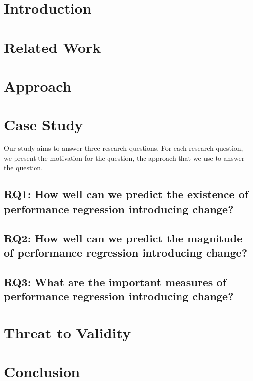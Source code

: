 \documentclass[conference]{IEEEtran}
\begin{document}
%
\IEEEpeerreviewmaketitle

\section{Introduction}
\label{sec:intro}


\section{Related Work}
\label{sec:related}


\section{Approach}
\label{sec:case}


\section{Case Study}
\label{sec:results}

Our study aims to answer three research questions. For each research question, we present 
the motivation for the question, the approach that we use to answer the question.

\subsection*{RQ1: How well can we predict the existence of performance regression introducing change?}


\subsection*{RQ2: How well can we predict the magnitude of performance regression introducing change?}


\subsection*{RQ3: What are the important measures of performance regression introducing change?}



%

\section{Threat to Validity}
\label{sec:threats}


\section{Conclusion}
\label{sec:conclusion}



 


\end{document}
